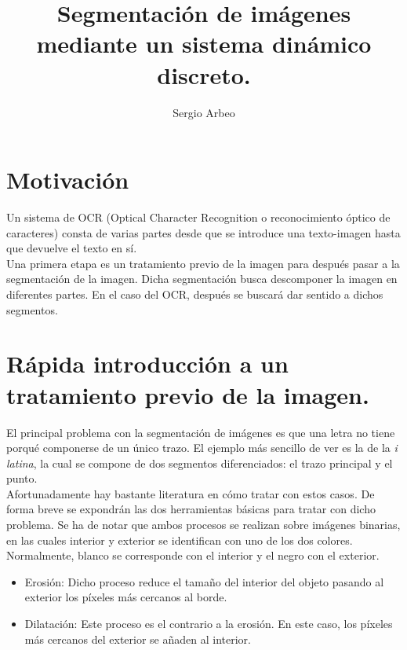 \documentclass[11pt]{amsart}
\title{Segmentaci\'on de im\'agenes mediante un sistema din\'amico discreto.}
\author{Sergio Arbeo}
\begin{document}
\maketitle
\section{Motivaci\'on}
Un sistema de OCR (Optical Character Recognition o reconocimiento \'optico de caracteres) consta de varias
partes desde que se introduce una texto-imagen hasta que devuelve el texto en s\'i.\\

Una primera etapa es un tratamiento previo de la imagen para despu\'es pasar a la segmentaci\'on de la imagen.
Dicha segmentaci\'on busca descomponer la imagen en diferentes partes. En el caso del OCR, despu\'es se buscar\'a
dar sentido a dichos segmentos.\\

\section{R\'apida introducci\'on a un tratamiento previo de la imagen.}

El principal problema con la segmentaci\'on de im\'agenes es que una letra no tiene porqu\'e componerse de un
\'unico trazo. El ejemplo m\'as sencillo de ver es la de la \emph{i latina}, la cual se compone de dos segmentos
diferenciados: el trazo principal y el punto.\\

Afortunadamente hay bastante literatura en c\'omo tratar con estos casos. De forma breve se expondr\'an las dos
herramientas b\'asicas para tratar con dicho problema. Se ha de notar que ambos procesos se realizan sobre
im\'agenes binarias, en las cuales interior y exterior se identifican con uno de los dos colores. Normalmente,
blanco se corresponde con el interior y el negro con el exterior.\\

\begin{itemize}
\item Erosi\'on: Dicho proceso reduce el tama\~no del interior del objeto pasando al exterior los p\'ixeles m\'as cercanos al borde.\\
\item Dilataci\'on: Este proceso es el contrario a la erosi\'on. En este caso, los p\'{i}xeles m\'as cercanos
del exterior se a\~naden al interior.
\end{itemize}
\end{document}
